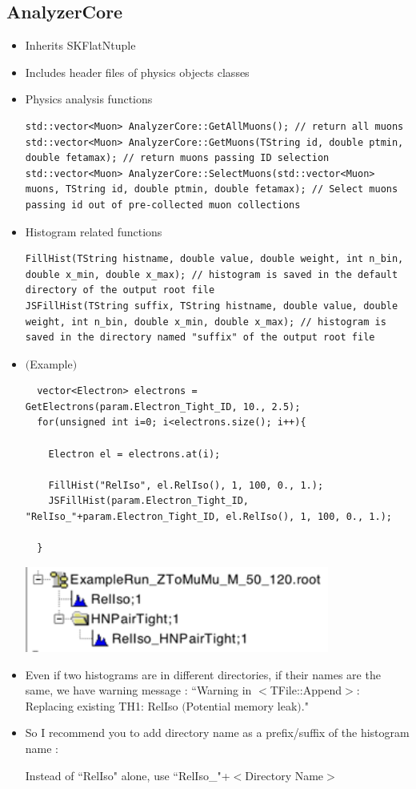\documentclass[12pt, a4paper, titlepage]{article}
\begin{document}
\subsection{AnalyzerCore}

\begin{itemize}
\item Inherits SKFlatNtuple
\item Includes header files of physics objects classes
\item Physics analysis functions
  \begin{lstlisting}
std::vector<Muon> AnalyzerCore::GetAllMuons(); // return all muons
std::vector<Muon> AnalyzerCore::GetMuons(TString id, double ptmin, double fetamax); // return muons passing ID selection
std::vector<Muon> AnalyzerCore::SelectMuons(std::vector<Muon> muons, TString id, double ptmin, double fetamax); // Select muons passing id out of pre-collected muon collections
  \end{lstlisting}
\item Histogram related functions
  \begin{lstlisting}
FillHist(TString histname, double value, double weight, int n_bin, double x_min, double x_max); // histogram is saved in the default directory of the output root file
JSFillHist(TString suffix, TString histname, double value, double weight, int n_bin, double x_min, double x_max); // histogram is saved in the directory named "suffix" of the output root file
  \end{lstlisting}
\item $($Example$)$
  \begin{lstlisting}
  vector<Electron> electrons = GetElectrons(param.Electron_Tight_ID, 10., 2.5);
  for(unsigned int i=0; i<electrons.size(); i++){

    Electron el = electrons.at(i);

    FillHist("RelIso", el.RelIso(), 1, 100, 0., 1.);
    JSFillHist(param.Electron_Tight_ID, "RelIso_"+param.Electron_Tight_ID, el.RelIso(), 1, 100, 0., 1.);

  }
  \end{lstlisting}
  \begin{minipage}{\linewidth}
    \centering
    \includegraphics[width=10cm]{Figures/HistogramOutputExample.png}
  \end{minipage}
\item Even if two histograms are in different directories, if their names are the same, we have warning message : ``Warning in $<$TFile::Append$>$: Replacing existing TH1: RelIso $($Potential memory leak$)$."
\item So I recommend you to add directory name as a prefix/suffix of the histogram name : \par
Instead of ``RelIso" alone, use ``RelIso\_"+$<$Directory Name$>$
\end{itemize}
\end{document}

